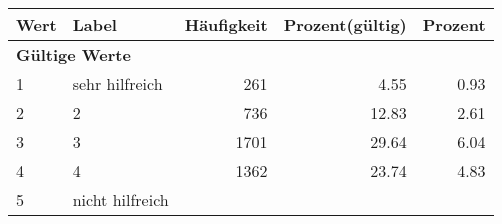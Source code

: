      \begin{longtable}{lXrrr}
     \toprule
     \textbf{Wert} & \textbf{Label} & \textbf{Häufigkeit} & \textbf{Prozent(gültig)} & \textbf{Prozent} \\
     \endhead
     \midrule
     \multicolumn{5}{l}{\textbf{Gültige Werte}}\\

     1 &
     \multicolumn{1}{X}{ sehr hilfreich   } &


       \num{261} &
       \num[round-mode=places,round-precision=2]{4,55} &
         \num[round-mode=places,round-precision=2]{0,93} \\

     2 &
     \multicolumn{1}{X}{ 2   } &


       \num{736} &
       \num[round-mode=places,round-precision=2]{12,83} &
         \num[round-mode=places,round-precision=2]{2,61} \\

     3 &
     \multicolumn{1}{X}{ 3   } &


       \num{1701} &
       \num[round-mode=places,round-precision=2]{29,64} &
         \num[round-mode=places,round-precision=2]{6,04} \\

     4 &
     \multicolumn{1}{X}{ 4   } &


       \num{1362} &
       \num[round-mode=places,round-precision=2]{23,74} &
         \num[round-mode=places,round-precision=2]{4,83} \\

     5 &
     \multicolumn{1}{X}{ nicht hilfreich   } &



\end{longtable}
